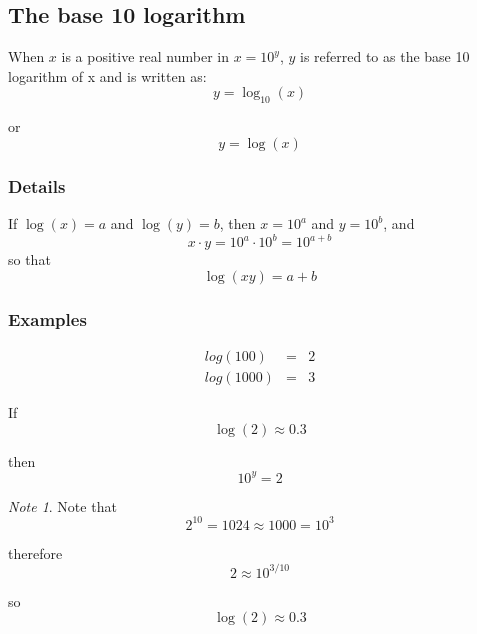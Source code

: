 \documentclass[12pt,a4paper]{article}
\theoremstyle{regla}
\theoremstyle{remark}
\newtheorem{notes}{Note}[section]
\theoremstyle{definition}
\theoremstyle{nonumberbreak}
\begin{document}
\subsection{The base 10 logarithm}
\begin{fbox}
\begin{minipage}{0.97\textwidth}
When $x$ is a positive real number in $x=10^y$, $y$ is referred to as the base 10 logarithm of x and is written as: 
$$ y=\log_{10}(x) $$

or 
$$ y=\log(x) $$



\end{minipage}
\end{fbox}
\subsubsection{Details}
If $\log (x) = a$ and $\log (y)=b$, then $x = 10^a$ and $y = 10^b$, and
$$ x \cdot y = 10^a \cdot 10^b = 10^{a+b}$$
so that $$ \log(xy) = a+b $$
\subsubsection{Examples}
\begin{xmpl}

\begin{eqnarray*}
log(100)&=& 2 \\
log(1000)&=& 3
\end{eqnarray*}
\end{xmpl}
\begin{xmpl}
If $$\log(2) \approx 0.3$$

 
then $$10^y=2$$

 
\begin {notes}
Note that 
$$2^{10}=1024 \approx 1000 = 10^3$$

therefore
$$2 \approx 10^{3/10}$$

so
$$\log (2) \approx 0.3$$
\end{notes}
\end{xmpl}



\end{document}
